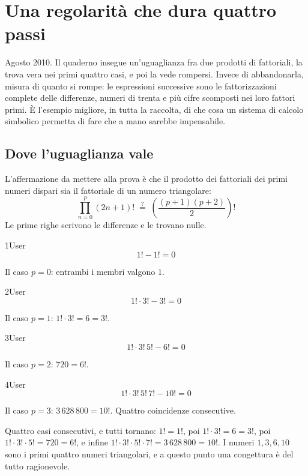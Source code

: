 \chapter{Una regolarità che dura quattro passi}
\label{cap:factor}

Agosto 2010. Il quaderno insegue un'uguaglianza fra due prodotti di fattoriali, la trova vera nei primi quattro casi, e poi la vede rompersi. Invece di abbandonarla, misura di quanto si rompe: le espressioni successive sono le fattorizzazioni complete delle differenze, numeri di trenta e più cifre scomposti nei loro fattori primi. È l'esempio migliore, in tutta la raccolta, di che cosa un sistema di calcolo simbolico permetta di fare che a mano sarebbe impensabile.

\section{Dove l'uguaglianza vale}

L'affermazione da mettere alla prova è che il prodotto dei fattoriali dei primi numeri dispari sia il fattoriale di un numero triangolare:
\[
  \prod_{n=0}^{p}(2n+1)!\;\overset{?}{=}\;\left(\frac{(p+1)(p+2)}{2}\right)!
\]
Le prime righe scrivono le differenze e le trovano nulle.

\begin{espr}{1}{User}{\verificata}
\[
1! - 1! = 0
\]
\end{espr}
Il caso $p=0$: entrambi i membri valgono $1$.

\begin{espr}{2}{User}{\verificata}
\[
1! \cdot 3! - 3! = 0
\]
\end{espr}
Il caso $p=1$: $1!\cdot3!=6=3!$.

\begin{espr}{3}{User}{\verificata}
\[
1! \cdot 3!\, 5! - 6! = 0
\]
\end{espr}
Il caso $p=2$: $720=6!$.

\begin{espr}{4}{User}{\verificata}
\[
1! \cdot 3!\, 5!\, 7! - 10! = 0
\]
\end{espr}
Il caso $p=3$: $3\,628\,800=10!$. Quattro coincidenze consecutive.


Quattro casi consecutivi, e tutti tornano: $1!=1!$, poi $1!\cdot3!=6=3!$, poi $1!\cdot3!\cdot5!=720=6!$, e infine $1!\cdot3!\cdot5!\cdot7!=3\,628\,800=10!$. I numeri $1,3,6,10$ sono i primi quattro numeri triangolari, e a questo punto una congettura è del tutto ragionevole.

